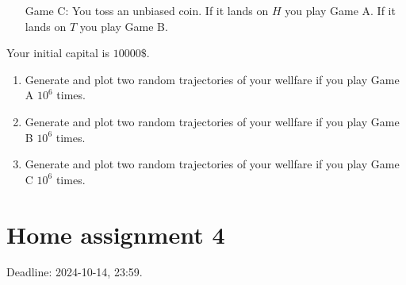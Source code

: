 \documentclass[12pt]{article}
\begin{document}
\begin{enumerate}
\begin{enumerate}
        \item[Game C:] You toss an unbiased coin.
        If it lands on $H$ you play Game A. If it lands on $T$ you play Game B. 
    \end{enumerate}
    
    Your initial capital is $10000\$$.

    \begin{enumerate}
        \item Generate and plot two random trajectories of your wellfare if you play Game A $10^6$ times.
        \item Generate and plot two random trajectories of your wellfare if you play Game B $10^6$ times.
        \item Generate and plot two random trajectories of your wellfare if you play Game C $10^6$ times.
    \end{enumerate}



    
      


\end{enumerate}


\section*{Home assignment 4}

Deadline: 2024-10-14, 23:59.
\end{document}
